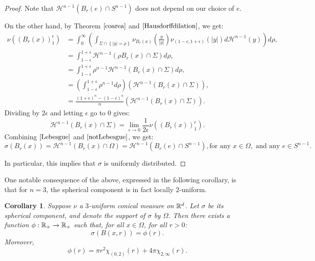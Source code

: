 \documentclass[11pt]{article}
\newtheorem{corollary}[theorem]{Corollary}
\theoremstyle{definition}
\theoremstyle{remark}
\numberwithin{equation}{section}
\begin{document}
\begin{proof}
  
  Note that $\mathcal{H}^{n-1}(B_r(e) \cap S^{n-1}) $ does not depend on our choice of $e$.
  
  On the other hand, by Theorem $\ref{coarea}$ and $\eqref{Hausdorffdilation}$, we get:
  \begin{align}
  \nu(\left( B_r(x) \right)_{1}^{\epsilon}) &= \int_{0}^{\infty} \left( \int_{\Sigma \cap \left\lbrace |y|=\rho \right\rbrace} \nu_{B_r(x)}\left(\frac{y}{|y|}\right) \nu_{(1-\epsilon,1+\epsilon)}(|y|)d\mathcal{H}^{n-1}(y) \right) d\rho, \nonumber
  \\&=\int_{1-\epsilon}^{1+\epsilon} \mathcal{H}^{n-1}(\rho B_r(x) \cap \Sigma) d\rho, \nonumber
  \\&= \int_{1-\epsilon}^{1+\epsilon} {\rho}^{n-1} \mathcal{H}^{n-1}(B_r(x) \cap \Sigma) d\rho, 
  \\&=\left(\int_{1-\epsilon}^{1+\epsilon} {\rho}^{n-1}  d\rho \right) \left(\mathcal{H}^{n-1}(B_r(x) \cap \Sigma) \right), \nonumber
  \\&=\frac{(1+\epsilon)^{n}- (1-\epsilon)^{n}}{n} \left(\mathcal{H}^{n-1}(B_r(x) \cap \Sigma) \right). \nonumber
  \end{align} 
   Dividing by $2 \epsilon$ and letting  $\epsilon$ go to $0$ gives:
   \begin{equation} \label{notLebesgue} 
   \mathcal{H}^{n-1}(B_r(x) \cap \Sigma)  =  \lim_{\epsilon \to 0} \frac{1}{2\epsilon}  \nu ( \left( B_r(x) \right)_{1}^{\epsilon} ).
   \end{equation}
   Combining $\eqref{Lebesgue}$ and $\eqref{notLebesgue}$, we get:
   \begin{equation} \label{sphericalunifdist}
    \sigma(B_r(x))=\mathcal{H}^{n-1}(B_r(x) \cap \Omega)=\mathcal{H}^{n-1}(B_r(e) \cap S^{n-1}), \text{for any } x \in \Omega, \text{ and any } e \in S^{n-1}.
    \end{equation}

  In particular, this implies that $\sigma$ is uniformly distributed. \end{proof}
  One notable consequence of the above, expressed in the following corollary, is that for $n=3$, the spherical component is in fact locally $2$-uniform.
  \begin{corollary}\label{3unif} Suppose $\nu$ a $3$-uniform conical measure on $\mathbb{R}^d$. Let $\sigma$ be its spherical component, and denote the support of $\sigma$ by $\Omega$. Then there exists a function $\phi: \mathbb{R}_{+} \rightarrow \mathbb{R}_{+} $ such that, for all $x \in  \Omega$, for all $r>0$:
  \begin{equation}\label{3unif1} \sigma(B(x,r))=\phi(r). 
  \end{equation} 
Moreover,   
  \begin{equation} \label{3unif2}
  \phi(r)=\pi r^{2} \chi_{(0,2)}(r)+4 \pi \chi_{2,\infty}(r). 
  \end{equation} \end{corollary}
  
\end{document}

